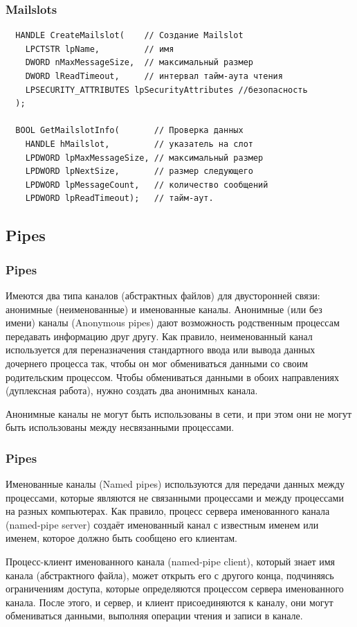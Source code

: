 \documentclass{beamer}
\begin{document}

\begin{frame}[fragile]
\frametitle{Mailslots}

\begin{verbatim}
  HANDLE CreateMailslot(    // Создание Mailslot
    LPCTSTR lpName,         // имя
    DWORD nMaxMessageSize,  // максимальный размер
    DWORD lReadTimeout,     // интервал тайм-аута чтения
    LPSECURITY_ATTRIBUTES lpSecurityAttributes //безопасность
  );

  BOOL GetMailslotInfo(       // Проверка данных
    HANDLE hMailslot,         // указатель на слот
    LPDWORD lpMaxMessageSize, // максимальный размер
    LPDWORD lpNextSize,       // размер следующего
    LPDWORD lpMessageCount,   // количество сообщений
    LPDWORD lpReadTimeout);   // тайм-аут.
\end{verbatim}

\end{frame}


\subsection{Pipes}
\begin{frame}
\frametitle{Pipes}

Имеются два типа каналов (абстрактных файлов) для двусторонней связи: анонимные (неименованные) и именованные каналы. Анонимные (или без имени) каналы (Anonymous pipes) дают возможность родственным процессам передавать информацию друг другу. Как правило, неименованный канал используется для переназначения стандартного ввода или вывода данных дочернего процесса так, чтобы он мог обмениваться данными со своим родительским процессом. Чтобы обмениваться данными в обоих направлениях (дуплексная работа), нужно создать два анонимных канала.
\medskip

Анонимные каналы не могут быть использованы в сети, и при этом они не могут быть использованы между несвязанными процессами.
\end{frame}


\begin{frame}
\frametitle{Pipes}

Именованные каналы (Named pipes) используются для передачи данных между процессами, которые являются не связанными процессами и между процессами на разных компьютерах. Как правило, процесс сервера именованного канала (named-pipe server) создаёт именованный канал с известным именем или именем, которое должно быть сообщено его клиентам.
\medskip

Процесс-клиент именованного канала (named-pipe client), который знает имя канала (абстрактного файла), может открыть его с другого конца, подчиняясь ограничениям доступа, которые определяются процессом сервера именованного канала. После этого, и сервер, и клиент присоединяются к каналу, они могут обмениваться данными, выполняя операции чтения и записи в канале.

\end{frame}
\end{document}
